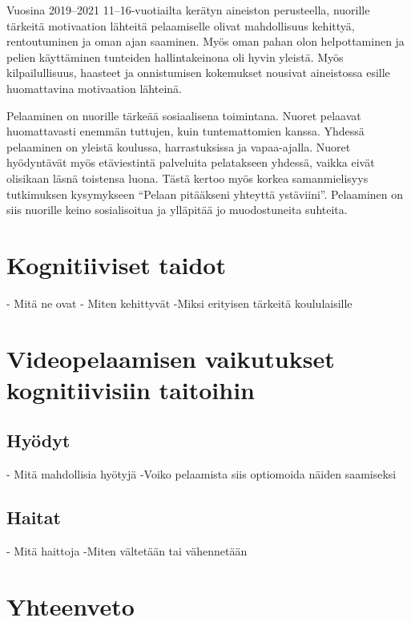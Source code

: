 \documentclass[utf8,bachelor]{gradu3}
\begin{document}
Vuosina 2019–2021 11–16-vuotiailta kerätyn aineiston perusteella, nuorille tärkeitä motivaation lähteitä pelaamiselle olivat mahdollisuus kehittyä, rentoutuminen ja oman ajan saaminen. Myös oman pahan olon helpottaminen ja pelien käyttäminen tunteiden hallintakeinona oli hyvin yleistä. Myös kilpailullisuus, haasteet ja onnistumisen kokemukset nousivat aineistossa esille huomattavina motivaation lähteinä. \parencite{laakso2023lasten} 

Pelaaminen on nuorille tärkeää sosiaalisena toimintana. Nuoret pelaavat huomattavasti enemmän tuttujen, kuin tuntemattomien kanssa. Yhdessä pelaaminen on yleistä koulussa, harrastuksissa ja vapaa-ajalla. Nuoret hyödyntävät myös etäviestintä palveluita pelatakseen yhdessä, vaikka eivät olisikaan läsnä toistensa luona. Tästä kertoo myös korkea samanmielisyys tutkimuksen kysymykseen “Pelaan pitääkseni yhteyttä ystäviini”. Pelaaminen on siis nuorille keino sosialisoitua ja ylläpitää jo muodostuneita suhteita. \parencite{laakso2023lasten} 

\chapter{Kognitiiviset taidot}
- Mitä ne ovat
- Miten kehittyvät
-Miksi erityisen tärkeitä koululaisille

\chapter{Videopelaamisen vaikutukset kognitiivisiin taitoihin}

\section{Hyödyt}
- Mitä mahdollisia hyötyjä
-Voiko pelaamista siis optiomoida näiden saamiseksi

\section{Haitat}
- Mitä haittoja
-Miten vältetään tai vähennetään

\chapter{Yhteenveto}

\printbibliography
\end{document}
